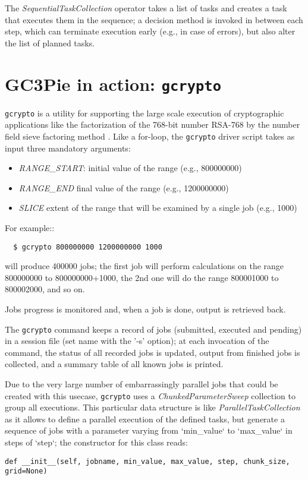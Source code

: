 \documentclass{PoS}
\begin{document}
The \emph{SequentialTaskCollection} operator takes a list of tasks and
creates a task that executes them in the sequence; a decision method
is invoked in between each step, which can terminate execution early
(e.g., in case of errors), but also alter the list of planned tasks.


\section{GC3Pie in action: \texttt{gcrypto}}
\texttt{gcrypto} is a utility for supporting the large scale execution
of cryptographic applications like the factorization of the 768-bit
number RSA-768 by the number field sieve factoring method
\cite{hetero2012}. Like a for-loop, the \texttt{gcrypto} driver script
takes as input three mandatory arguments:
\begin{itemize}
\item{\it RANGE\_START}: initial value of the range (e.g., 800000000)
\item{\it RANGE\_END} final value of the range (e.g., 1200000000)
\item{\it SLICE} extent of the range that will be examined by a single
  job (e.g., 1000)
\end{itemize}

For example::
\begin{verbatim}
  $ gcrypto 800000000 1200000000 1000
\end{verbatim}

will produce 400000 jobs; the first job will perform calculations
on the range 800000000 to 800000000+1000, the 2nd one will do the
range 800001000 to 800002000, and so on.

Jobs progress is monitored and, when a job is done, output is
retrieved back.

The \texttt{gcrypto} command keeps a record of jobs (submitted, executed and
pending) in a session file (set name with the '-s' option); at each
invocation of the command, the status of all recorded jobs is updated,
output from finished jobs is collected, and a summary table of all
known jobs is printed. 

Due to the very large number of embarrassingly parallel jobs that could be
created with this usecase, \texttt{gcrypto} uses a {\it ChunkedParameterSweep}
collection to group all executions. This particular data structure is
like {\it ParallelTaskCollection} as it allows to define a parallel
execution of the defined tasks, but generate a sequence of jobs with a
parameter varying from `min\_value` to `max\_value` in steps of `step`;
the constructor for this class reads:
\begin{verbatim}
def __init__(self, jobname, min_value, max_value, step, chunk_size,
grid=None)
\end{verbatim}
\end{document}
